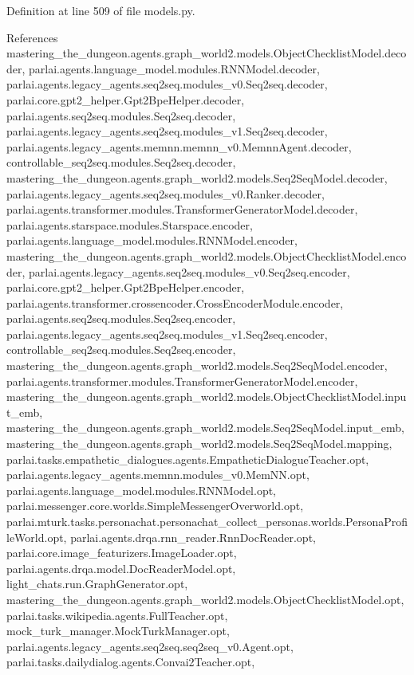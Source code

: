 Definition at line 509 of file models.\+py.



References mastering\+\_\+the\+\_\+dungeon.\+agents.\+graph\+\_\+world2.\+models.\+Object\+Checklist\+Model.\+decoder, parlai.\+agents.\+language\+\_\+model.\+modules.\+R\+N\+N\+Model.\+decoder, parlai.\+agents.\+legacy\+\_\+agents.\+seq2seq.\+modules\+\_\+v0.\+Seq2seq.\+decoder, parlai.\+core.\+gpt2\+\_\+helper.\+Gpt2\+Bpe\+Helper.\+decoder, parlai.\+agents.\+seq2seq.\+modules.\+Seq2seq.\+decoder, parlai.\+agents.\+legacy\+\_\+agents.\+seq2seq.\+modules\+\_\+v1.\+Seq2seq.\+decoder, parlai.\+agents.\+legacy\+\_\+agents.\+memnn.\+memnn\+\_\+v0.\+Memnn\+Agent.\+decoder, controllable\+\_\+seq2seq.\+modules.\+Seq2seq.\+decoder, mastering\+\_\+the\+\_\+dungeon.\+agents.\+graph\+\_\+world2.\+models.\+Seq2\+Seq\+Model.\+decoder, parlai.\+agents.\+legacy\+\_\+agents.\+seq2seq.\+modules\+\_\+v0.\+Ranker.\+decoder, parlai.\+agents.\+transformer.\+modules.\+Transformer\+Generator\+Model.\+decoder, parlai.\+agents.\+starspace.\+modules.\+Starspace.\+encoder, parlai.\+agents.\+language\+\_\+model.\+modules.\+R\+N\+N\+Model.\+encoder, mastering\+\_\+the\+\_\+dungeon.\+agents.\+graph\+\_\+world2.\+models.\+Object\+Checklist\+Model.\+encoder, parlai.\+agents.\+legacy\+\_\+agents.\+seq2seq.\+modules\+\_\+v0.\+Seq2seq.\+encoder, parlai.\+core.\+gpt2\+\_\+helper.\+Gpt2\+Bpe\+Helper.\+encoder, parlai.\+agents.\+transformer.\+crossencoder.\+Cross\+Encoder\+Module.\+encoder, parlai.\+agents.\+seq2seq.\+modules.\+Seq2seq.\+encoder, parlai.\+agents.\+legacy\+\_\+agents.\+seq2seq.\+modules\+\_\+v1.\+Seq2seq.\+encoder, controllable\+\_\+seq2seq.\+modules.\+Seq2seq.\+encoder, mastering\+\_\+the\+\_\+dungeon.\+agents.\+graph\+\_\+world2.\+models.\+Seq2\+Seq\+Model.\+encoder, parlai.\+agents.\+transformer.\+modules.\+Transformer\+Generator\+Model.\+encoder, mastering\+\_\+the\+\_\+dungeon.\+agents.\+graph\+\_\+world2.\+models.\+Object\+Checklist\+Model.\+input\+\_\+emb, mastering\+\_\+the\+\_\+dungeon.\+agents.\+graph\+\_\+world2.\+models.\+Seq2\+Seq\+Model.\+input\+\_\+emb, mastering\+\_\+the\+\_\+dungeon.\+agents.\+graph\+\_\+world2.\+models.\+Seq2\+Seq\+Model.\+mapping, parlai.\+tasks.\+empathetic\+\_\+dialogues.\+agents.\+Empathetic\+Dialogue\+Teacher.\+opt, parlai.\+agents.\+legacy\+\_\+agents.\+memnn.\+modules\+\_\+v0.\+Mem\+N\+N.\+opt, parlai.\+agents.\+language\+\_\+model.\+modules.\+R\+N\+N\+Model.\+opt, parlai.\+messenger.\+core.\+worlds.\+Simple\+Messenger\+Overworld.\+opt, parlai.\+mturk.\+tasks.\+personachat.\+personachat\+\_\+collect\+\_\+personas.\+worlds.\+Persona\+Profile\+World.\+opt, parlai.\+agents.\+drqa.\+rnn\+\_\+reader.\+Rnn\+Doc\+Reader.\+opt, parlai.\+core.\+image\+\_\+featurizers.\+Image\+Loader.\+opt, parlai.\+agents.\+drqa.\+model.\+Doc\+Reader\+Model.\+opt, light\+\_\+chats.\+run.\+Graph\+Generator.\+opt, mastering\+\_\+the\+\_\+dungeon.\+agents.\+graph\+\_\+world2.\+models.\+Object\+Checklist\+Model.\+opt, parlai.\+tasks.\+wikipedia.\+agents.\+Full\+Teacher.\+opt, mock\+\_\+turk\+\_\+manager.\+Mock\+Turk\+Manager.\+opt, parlai.\+agents.\+legacy\+\_\+agents.\+seq2seq.\+seq2seq\+\_\+v0.\+Agent.\+opt, parlai.\+tasks.\+dailydialog.\+agents.\+Convai2\+Teacher.\+opt, 